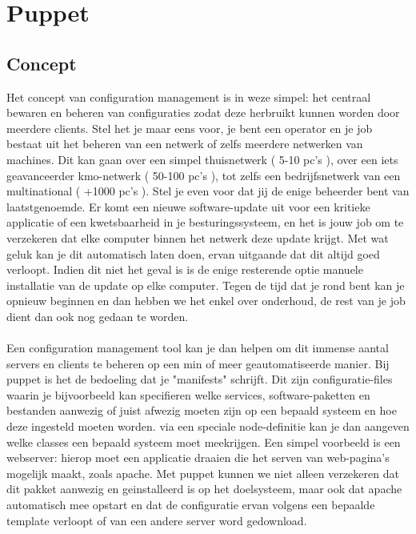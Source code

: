 \chapter{Puppet}

\section{Concept}
Het concept van configuration management is in weze simpel: het centraal bewaren en beheren van configuraties zodat deze herbruikt kunnen worden door meerdere clients. Stel het je maar eens voor, je bent een operator en je job bestaat uit het beheren van een netwerk of zelfs meerdere netwerken van machines. Dit kan gaan over een simpel thuisnetwerk ( 5-10 pc's ), over een iets geavanceerder kmo-netwerk ( 50-100 pc's ), tot zelfs een bedrijfsnetwerk van een multinational ( +1000 pc's ). Stel je even voor dat jij de enige beheerder bent van laatstgenoemde. Er komt een nieuwe software-update uit voor een kritieke applicatie of een kwetsbaarheid in je besturingssysteem, en het is jouw job om te verzekeren dat elke computer binnen het netwerk deze update krijgt. Met wat geluk kan je dit automatisch laten doen, ervan uitgaande dat dit altijd goed verloopt. Indien dit niet het geval is is de enige resterende optie manuele installatie van de update op elke computer. Tegen de tijd dat je rond bent kan je opnieuw beginnen en dan hebben we het enkel over onderhoud, de rest van je job dient dan ook nog gedaan te worden.\\\\
%
Een configuration management tool kan je dan helpen om dit immense aantal servers en clients te beheren op een min of meer geautomatiseerde manier. Bij puppet is het de bedoeling dat je "manifests" schrijft. Dit zijn configuratie-files waarin je bijvoorbeeld kan specifieren welke services, software-paketten en bestanden aanwezig of juist afwezig moeten zijn op een bepaald systeem en hoe deze ingesteld moeten worden. via een speciale node-definitie kan je dan aangeven welke classes een bepaald systeem moet meekrijgen. Een simpel voorbeeld is een webserver: hierop moet een applicatie draaien die het serven van web-pagina's mogelijk maakt, zoals apache. Met puppet kunnen we niet alleen verzekeren dat dit pakket aanwezig en geinstalleerd is op het doelsysteem, maar ook dat apache automatisch mee opstart en dat de configuratie ervan volgens een bepaalde template verloopt of van een andere server word gedownload.\\\\

